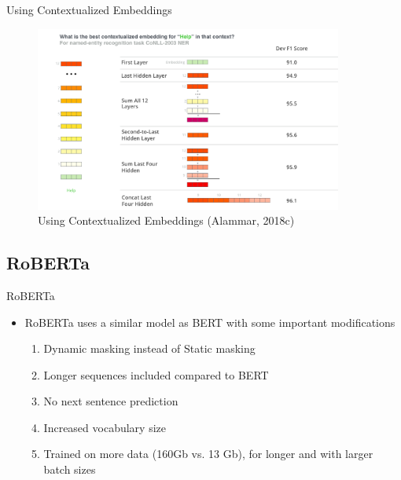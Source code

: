 \documentclass[10pt]{beamer}
\begin{document}
\begin{frame}{Using Contextualized Embeddings}

\begin{figure}[h]
\centering
\includegraphics[width=0.9\textwidth]{fig/bert-feature-extraction-contextualized-embeddings.png}
\caption{Using Contextualized Embeddings (Alammar, 2018c)}
\end{figure}

\end{frame}




\subsection{RoBERTa}

\begin{frame}{RoBERTa}
\begin{itemize}
    \item RoBERTa uses a similar model as BERT with some important modifications
\begin{enumerate}
    \item Dynamic masking instead of Static masking
    \pause
    \item Longer sequences included compared to BERT
    \pause
    \item No next sentence prediction
    \pause
    \item Increased vocabulary size
    \pause
    \item Trained on more data (160Gb vs. 13 Gb), for longer and with larger batch sizes
\end{enumerate}
\end{itemize}

\end{frame}
\end{document}
